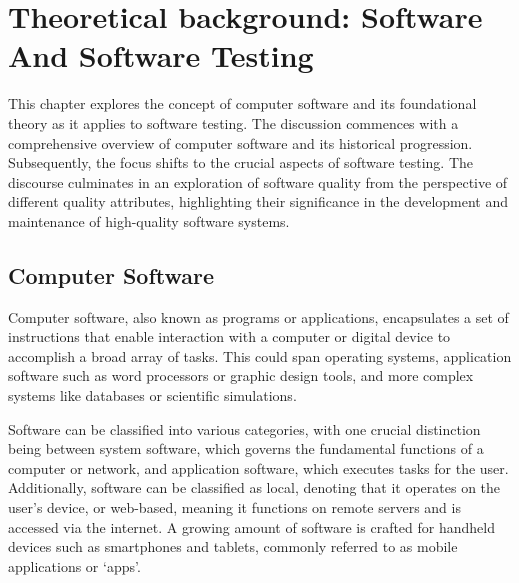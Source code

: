 \vspace{21.5pt}
\chapter{Theoretical background: Software And Software Testing}

This chapter explores the concept of computer software and its foundational
theory as it applies to software testing. The discussion commences with a
comprehensive overview of computer software and its historical progression.
Subsequently, the focus shifts to the crucial aspects of software testing.
The discourse culminates in an exploration of software quality from the
perspective of different quality attributes, highlighting their
significance in the development and maintenance of high-quality software systems.

\section{Computer Software}
Computer software, also known as programs or applications, encapsulates a set of instructions that
enable interaction with a computer or digital device to accomplish a broad array of
tasks\cite{Software76:online}. This could span operating systems\cite{stallings1998operating},
application software\cite{Definiti63:online} such as
word processors or graphic design tools, and more complex systems like databases or
scientific simulations\cite{Definiti63:online}.

Software can be classified into various categories, with one crucial distinction
being between system software, which governs the fundamental functions of a
computer or network, and application software, which executes tasks for the
user\cite{WhatisSy89:online}\cite{Definiti63:online}.
Additionally, software can be classified as local, denoting that it operates on
the user's device, or web-based, meaning it functions on remote servers and is
accessed via the internet. A growing amount of software is crafted for handheld
devices such as smartphones and tablets, commonly referred to as mobile
applications or `apps'\cite{yetisen2014regulation}.

